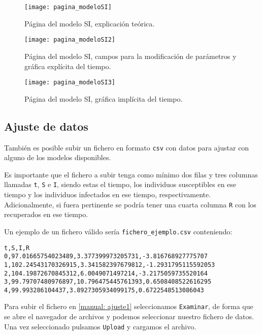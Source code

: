 \begin{figure}
\begin{center}
\caption{Página del modelo SI, explicación teórica.}
\label{manual: modeloSI1}
\texttt{[image: pagina\_modeloSI]}
\end{center}
\end{figure}

\begin{figure}
\begin{center}
\caption{Página del modelo SI, campos para la modificación de parámetros y gráfica explícita del tiempo.}
\label{manual: modeloSI2}
\texttt{[image: pagina\_modeloSI2]}
\end{center}
\end{figure}

\begin{figure}
\begin{center}
\caption{Página del modelo SI, gráfica implícita del tiempo.}
\label{manual: modeloSI3}
\texttt{[image: pagina\_modeloSI3]}
\end{center}
\end{figure}

\subsection{Ajuste de datos}

También es posible subir un fichero en formato \verb|csv| con datos para ajustar con alguno de los modelos disponibles.

Es importante que el fichero a subir tenga como mínimo dos filas y tres columnas llamadas \verb|t|, \verb|S| e \verb|I|, siendo estas el tiempo, los individuos susceptibles en ese tiempo y los individuos infectados en ese tiempo, respectivamente. Adicionalmente, si fuera pertinente se podría tener una cuarta columna \verb|R| con los recuperados en ese tiempo.

Un ejemplo de un fichero válido sería \verb|fichero_ejemplo.csv| conteniendo:

\begin{verbatim}
t,S,I,R
0,97.01665754023489,3.377399973205731,-3.816768927775707
1,102.24543170326915,3.341582397679812,-1.2931795115592053
2,104.19872670845312,6.0049071497214,-3.2175059735520164
3,99.79707480976897,10.796475445761393,0.6508408522616295
4,99.993286104437,3.8927305934099175,0.6722548513086043
\end{verbatim}

Para subir el fichero en \eqref{manual: ajuste1} seleccionamos \verb|Examinar|, de forma que se abre el navegador de archivos y podemos seleccionar nuestro fichero de datos. Una vez seleccionado pulsamos \verb|Upload| y cargamos el archivo.

